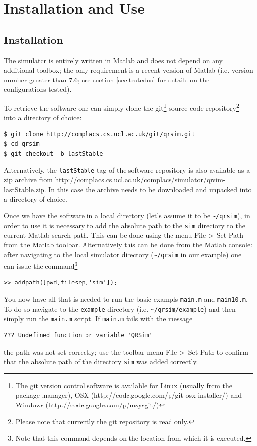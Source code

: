 \documentclass[a4paper,11pt]{report}
\newcommand{\webrepo}{\url{http://complacs.cs.ucl.ac.uk/complacs/simulator/qrsim-lastStable.zip}\xspace}
\begin{document}
\chapter{Installation and Use}

\section{Installation}
The simulator is entirely written in Matlab and does not depend on any additional toolbox; the only requirement is a recent version of Matlab (i.e. version number greater  than 7.6; see section \ref{sec:testedos} for details on the configurations tested).

To retrieve the software one can simply clone the git\footnote{The git version control software is available for Linux (usually from the package manager), OSX (http://code.google.com/p/git-osx-installer/) and Windows (http://code.google.com/p/msysgit/)} source code repository\footnote{Please note that currently the git repository is read only.} into a directory of choice:
\begin{verbatim}
$ git clone http://complacs.cs.ucl.ac.uk/git/qrsim.git
$ cd qrsim
$ git checkout -b lastStable
\end{verbatim}
Alternatively, the \texttt{lastStable} tag of the software repository is also available as a zip archive from \webrepo. In this case the archive needs to be downloaded and unpacked into a directory of choice.

Once we have the software in a local directory (let's assume it to be \texttt{\textasciitilde/qrsim}), in order to use it is necessary to add the absolute path to the \texttt{sim} directory to the current Matlab search path. 
This can be done using the menu \textsf{File \textgreater ~Set Path} from the Matlab toolbar. Alternatively this can be done from the Matlab console: after navigating to the local simulator directory (\texttt{\textasciitilde/qrsim} in our example) one can issue the command\footnote{Note that this command depends on the location from which it is executed.} 
\begin{verbatim}
>> addpath([pwd,filesep,'sim']);
\end{verbatim} 

You now have all that is needed to run the basic exampls \texttt{main.m} and \texttt{main10.m}. 
To do so navigate to the \texttt{example} directory (i.e. \texttt{\textasciitilde/qrsim/example}) and then simply run the \texttt{main.m} script.
If \texttt{main.m} fails with the message 
\begin{verbatim}??? Undefined function or variable 'QRSim'\end{verbatim}
the path was not set correctly; use the toolbar menu \textsf{File \textgreater ~Set Path} to confirm that the absolute path of the directory \texttt{sim} was added correctly.
\end{document}
